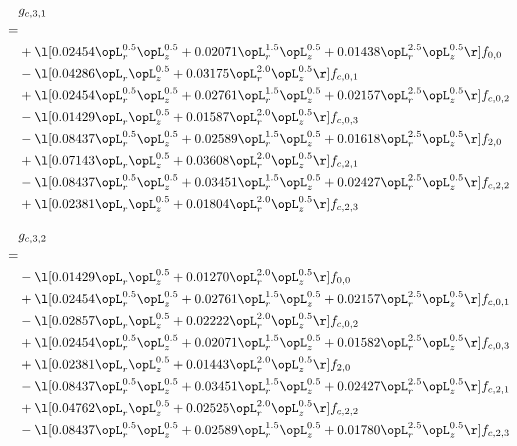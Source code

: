 \begin{alignat}{2} 
\label{eq:g_31_0} 
& g_{c,3,1} \nonumber \\ 
 = \\ 
& + \l[  0.02454 \opL_r^{0.5} \opL_z^{0.5} +  0.02071 \opL_r^{1.5} \opL_z^{0.5} +  0.01438 \opL_r^{2.5} \opL_z^{0.5}  \r] f_{0,0} \nonumber \\ 
& - \l[  0.04286 \opL_r \opL_z^{0.5} +  0.03175 \opL_r^{2.0} \opL_z^{0.5}  \r] f_{c,0,1} \nonumber \\ 
& + \l[  0.02454 \opL_r^{0.5} \opL_z^{0.5} +  0.02761 \opL_r^{1.5} \opL_z^{0.5} +  0.02157 \opL_r^{2.5} \opL_z^{0.5}  \r] f_{c,0,2} \nonumber \\ 
& - \l[  0.01429 \opL_r \opL_z^{0.5} +  0.01587 \opL_r^{2.0} \opL_z^{0.5}  \r] f_{c,0,3} \nonumber \\ 
& - \l[  0.08437 \opL_r^{0.5} \opL_z^{0.5} +  0.02589 \opL_r^{1.5} \opL_z^{0.5} +  0.01618 \opL_r^{2.5} \opL_z^{0.5}  \r] f_{2,0} \nonumber \\ 
& + \l[  0.07143 \opL_r \opL_z^{0.5} +  0.03608 \opL_r^{2.0} \opL_z^{0.5}  \r] f_{c,2,1} \nonumber \\ 
& - \l[  0.08437 \opL_r^{0.5} \opL_z^{0.5} +  0.03451 \opL_r^{1.5} \opL_z^{0.5} +  0.02427 \opL_r^{2.5} \opL_z^{0.5}  \r] f_{c,2,2} \nonumber \\ 
& + \l[  0.02381 \opL_r \opL_z^{0.5} +  0.01804 \opL_r^{2.0} \opL_z^{0.5}  \r] f_{c,2,3} \nonumber \\ 
\end{alignat} 


\begin{alignat}{2} 
\label{eq:g_32_0} 
& g_{c,3,2} \nonumber \\ 
 = \\ 
& - \l[  0.01429 \opL_r \opL_z^{0.5} +  0.01270 \opL_r^{2.0} \opL_z^{0.5}  \r] f_{0,0} \nonumber \\ 
& + \l[  0.02454 \opL_r^{0.5} \opL_z^{0.5} +  0.02761 \opL_r^{1.5} \opL_z^{0.5} +  0.02157 \opL_r^{2.5} \opL_z^{0.5}  \r] f_{c,0,1} \nonumber \\ 
& - \l[  0.02857 \opL_r \opL_z^{0.5} +  0.02222 \opL_r^{2.0} \opL_z^{0.5}  \r] f_{c,0,2} \nonumber \\ 
& + \l[  0.02454 \opL_r^{0.5} \opL_z^{0.5} +  0.02071 \opL_r^{1.5} \opL_z^{0.5} +  0.01582 \opL_r^{2.5} \opL_z^{0.5}  \r] f_{c,0,3} \nonumber \\ 
& + \l[  0.02381 \opL_r \opL_z^{0.5} +  0.01443 \opL_r^{2.0} \opL_z^{0.5}  \r] f_{2,0} \nonumber \\ 
& - \l[  0.08437 \opL_r^{0.5} \opL_z^{0.5} +  0.03451 \opL_r^{1.5} \opL_z^{0.5} +  0.02427 \opL_r^{2.5} \opL_z^{0.5}  \r] f_{c,2,1} \nonumber \\ 
& + \l[  0.04762 \opL_r \opL_z^{0.5} +  0.02525 \opL_r^{2.0} \opL_z^{0.5}  \r] f_{c,2,2} \nonumber \\ 
& - \l[  0.08437 \opL_r^{0.5} \opL_z^{0.5} +  0.02589 \opL_r^{1.5} \opL_z^{0.5} +  0.01780 \opL_r^{2.5} \opL_z^{0.5}  \r] f_{c,2,3} \nonumber \\ 
\end{alignat} 


